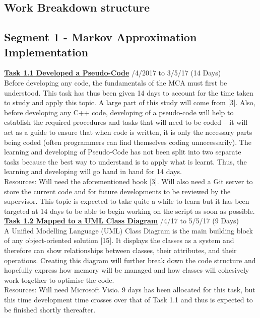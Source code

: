 \documentclass[11pt,draftd]{article}
\begin{document}
\begin{appendices}
	\section{Work Breakdown structure}\label{app_itemB}
	\subsection{Segment 1 - Markov Approximation Implementation}
	\underline{\textbf{Task 1.1 Developed a Pseudo-Code}} /4/2017 to 3/5/17 (14 Days) \\
	
	\noindent Before developing any code, the fundamentals of the MCA must first be understood. This task has thus been given 14 days to account for the time taken to study and apply this topic. A large part of this study will come from [3]. Also, before developing any C++ code, developing of a pseudo-code will help to establish the required procedures and tasks that will need to be coded – it will act as a guide to ensure that when code is written, it is only the necessary parts being coded (often programmers can find themselves coding unnecessarily). 
	The learning and developing of Pseudo-Code has not been split into two separate tasks because the best way to understand is to apply what is learnt. Thus, the learning and developing will go hand in hand for 14 days. \\
	Resources: Will need the aforementioned book [3]. Will also need a Git server to store the current code and for future developments to be reviewed by the supervisor. This topic is expected to take quite a while to learn but it has been targeted at 14 days to be able to begin working on the script as soon as possible. \\
		
	\noindent\underline{\textbf{Task 1.2 Mapped to a UML Class Diagram}} /4/17 to 5/5/17 (9 Days) \\
	
	\noindent A Unified Modelling Language (UML) Class Diagram is the main building block of any object-oriented solution [15]. It displays the classes as a system and therefore can show relationships between classes, their attributes, and their operations. Creating this diagram will further break down the code structure and hopefully express how memory will be managed and how classes will cohesively work together to optimise the code. \\
	Resources: Will need Microsoft Visio. 9 days has been allocated for this task, but this time development time crosses over that of Task 1.1 and thus is expected to be finished shortly thereafter. \\
	

\end{appendices}
\end{document}
